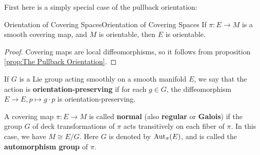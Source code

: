 \documentclass[../main.tex]{subfiles}
\begin{document}
First here is a simply special case of the pullback orientation:
\begin{proposition}{Orientation of Covering Spaces}{Orientation of Covering Spaces}
  If $\pi: E \to M$ is a smooth covering map, and $M$ is orientable, then $E$ is orientable.
\end{proposition}
\begin{proof}
  Covering maps are local diffeomorphisms, so it follows from proposition \ref{prop:The Pullback Orientation}.
\end{proof}

If $G$ is a Lie group acting smoothly on a smooth manifold $E$, we say that the action is \textbf{orientation-preserving} if for each $g \in G$, the diffeomorphism $E \to E, p \mapsto g \cdot p$ is orientation-preserving.

A covering map $\pi: E \rightarrow M$ is called \textbf{normal} (also \textbf{regular} or \textbf{Galois}) if the group $G$ of deck transformations of $\pi$ acts transitively on each fiber of $\pi$. In this case, we have $M \cong E/G$. Here $G$ is denoted by $\operatorname{Aut}_\pi(E)$, and is called the \textbf{automorphism group} of $\pi$.
\end{document}
